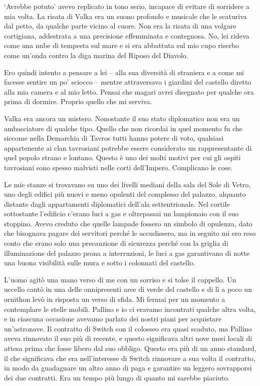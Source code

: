 `Avrebbe potuto' avevo replicato in tono serio, incapace di evitare di
sorridere a mia volta. La risata di Valka era un suono profondo e
musicale che le scaturiva dal petto, da qualche parte vicino al cuore.
Non era la risata di una volgare cortigiana, addestrata a una precisione
effemminata e contegnosa. No, lei rideva come una nube di tempesta sul
mare e si era abbattuta sul mio cupo riserbo come un'onda contro la diga
marina del Riposo del Diavolo.

Ero quindi intento a pensare a lei -- alla sua diversità di straniera e
a come mi facesse sentire un po' sciocco -- mentre attraversavo i
giardini del castello diretto alla mia camera e al mio letto. Pensai che
magari avrei disegnato per qualche ora prima di dormire. Proprio quello
che mi serviva.

Valka era ancora un mistero. Nonostante il suo stato diplomatico non era
un ambasciatore di qualche tipo. Quello che non ricordai in quel momento
fu che siccome nella Demarchia di Tavros tutti hanno potere di voto,
qualsiasi appartenente ai clan tavrosiani potrebbe essere considerato un
rappresentante di quel popolo strano e lontano. Questo è uno dei molti
motivi per cui gli ospiti tavrosiani sono spesso malvisti nelle corti
dell'Impero. Complicano le cose.

Le mie stanze si trovavano su uno dei livelli mediani della sala del
Sole di Vetro, uno degli edifici più nuovi e meno opulenti del complesso
del palazzo, alquanto distante dagli appartamenti diplomatici dell'ala
settentrionale. Nel cortile sottostante l'edificio c'erano luci a gas e
oltrepassai un lampionaio con il suo stoppino. Avevo creduto che quelle
lampade fossero un simbolo di opulenza, dato che bisognava pagare dei
servitori perché le accudissero, ma in seguito mi ero reso conto che
erano solo una precauzione di {sicurezza} perché con la griglia di
illuminazione del palazzo prona a interruzioni, le luci a gas
garantivano di notte una buona visibilità sulle mura e sotto i colonnati
del castello.

L'uomo agitò una mano verso di me con un sorriso e si tolse il cappello.
Un uccello cantò in una delle onnipresenti aree di verde del castello e
di lì a poco un ornithon levò in risposta un verso di sfida. Mi fermai
per un momento a contemplare le stelle mobili. Pallino e io ci eravamo
incontrati qualche altra volta, e in ciascuna occasione avevamo parlato
dei nostri piani per acquistare un'astronave. Il contratto di Switch con
il colosseo era quasi scaduto, ma Pallino aveva rinnovato il suo più di
recente, e questo significava altri nove mesi locali di attesa prima che
fosse libero dal suo obbligo. Questo era più di un anno standard, il che
significava che era nell'interesse di Switch rinnovare a sua volta il
contratto, in modo da guadagnare un altro anno di paga e garantire un
leggero sovrapporsi dei due contratti. Era un tempo più lungo di quanto
mi sarebbe piaciuto.

